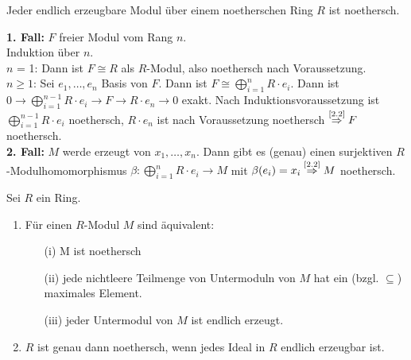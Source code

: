 \begin{Folg}
\label{2.3}
  Jeder endlich erzeugbare Modul über einem noetherschen Ring $R$ ist
  noethersch.
\end{Folg}

\begin{Bew}
  \textbf{1. Fall:} $F$ freier Modul vom Rang $n$.\\
  Induktion über $n$.\\
  $n$ = 1: Dann ist $F \cong R$ als $R$-Modul, also noethersch nach
  Voraussetzung.\\
  $n \ge 1$: Sei $e_1, \dots , e_n$ Basis von $F$. Dann ist $F \cong
  \bigoplus_{i = 1}^n R \cdot e_i$. Dann ist $0 \to \bigoplus_{i = 1}^{n-1} R \cdot
  e_i \to F \to R \cdot e_n \to 0$ exakt. Nach Induktionsvoraussetzung ist
  $\bigoplus_{i = 1}^{n-1} R \cdot e_i$ noethersch, $R \cdot e_n$ ist nach
  Voraussetzung noethersch $\overset{\mbox{\scriptsize \ref{2.2}}}{\Rightarrow}
  F$ noethersch.\\
  \textbf{2. Fall:} $M$ werde erzeugt von $x_1, \dots , x_n$. Dann gibt es
  (genau) einen surjektiven $R$-Modulhomomorphismus $\beta: \bigoplus_{i = 1}^n
  R \cdot e_i \to M$ mit $\beta(e_i) = x_i \overset{\mbox{\scriptsize
  \ref{2.2}}}{\Rightarrow} M$ noethersch.
\end{Bew}

\begin{Prop}
  Sei $R$ ein Ring.
  \begin{enumerate}
    \item \label{2.4a}Für einen $R$-Modul $M$ sind äquivalent:
      \begin{enumerate}
        \item[(i)] M ist noethersch
        \item[(ii)] jede nichtleere Teilmenge von Untermoduln von $M$ hat ein
                    (bzgl. $\subseteq$) maximales Element.
        \item[(iii)] jeder Untermodul von $M$ ist endlich erzeugt.
      \end{enumerate}
    \item $R$ ist genau dann noethersch, wenn jedes Ideal in $R$ endlich
          erzeugbar ist.
  \end{enumerate}
\end{Prop}


